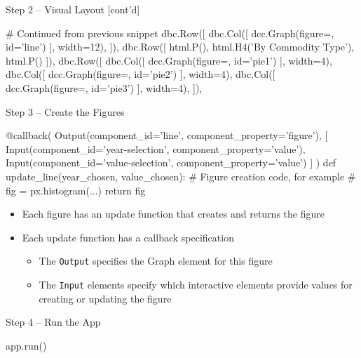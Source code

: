 \documentclass[ignorenonframetext,xcolor=x11names]{beamer}
\begin{document}
\begin{frame}[label=withcode,fragile]{Step 2 -- Visual Layout \small [cont'd]}
\begin{pythoncode}
# Continued from previous snippet
   dbc.Row([
        dbc.Col([
            dcc.Graph(figure={}, id='line')
        ], width=12),
    ]),
    dbc.Row([
        html.P(),
        html.H4('By Commodity Type'),
        html.P()
    ]),
    dbc.Row([
        dbc.Col([
            dcc.Graph(figure={}, id='pie1')
        ], width=4),
        dbc.Col([
            dcc.Graph(figure={}, id='pie2')
        ], width=4),
        dbc.Col([
            dcc.Graph(figure={}, id='pie3')
        ], width=4),
    ]),
\end{pythoncode}
\end{frame}

\begin{frame}[label=withcode,fragile]{Step 3 -- Create the Figures}
\begin{pythoncode}
@callback(
    Output(component_id='line', component_property='figure'),
    [
        Input(component_id='year-selection', 
              component_property='value'),
        Input(component_id='value-selection', 
              component_property='value')
    ]
)
def update_line(year_chosen, value_chosen): 
    # Figure creation code, for example
    # fig = px.histogram(...)
    return fig
\end{pythoncode}
\footnotesize
\begin{itemize}
   \item Each figure has an update function that creates and returns the figure
   \item Each update function has a callback specification
   \begin{itemize}
   \footnotesize
      \item The \texttt{Output} specifies the Graph element for this figure
      \item The \texttt{Input} elements specify which interactive elements provide values for creating or updating the figure
   \end{itemize}
\end{itemize}
\end{frame}

\begin{frame}[label=withcode,fragile]{Step 4 -- Run the App}

\begin{pythoncode}
app.run()
\end{pythoncode}
\end{frame}
\end{document}
